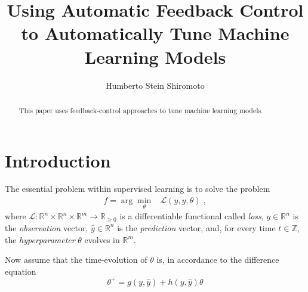 \documentclass{tufte-handout}
\title{Using Automatic Feedback Control to Automatically Tune Machine Learning Models}
\author[H. Stein Shiromoto]{Humberto Stein Shiromoto}
\begin{document}
\maketitle%

\begin{abstract}
\noindent
This paper uses feedback-control approaches to tune machine learning models.
\end{abstract}


\section{Introduction}

The essential problem within supervised learning is to solve the problem
\begin{eqnarray}
  f=\arg\min_\theta&\mathcal{L}(y,\hat{y},\theta)\;,
\end{eqnarray}
where $\mathcal{L}:\mathbb{R}^n\times\mathbb{R}^n\times\mathbb{R}^m\to\mathbb{R}_{\geq0}$ is a differentiable functional called \emph{loss}, $y\in\mathbb{R}^n$ is the \emph{observation} vector, $\hat{y}\in\mathbb{R}^n$ is the \emph{prediction} vector, and, for every time $t\in\mathbb{Z}$, the \emph{hyperparameter} $\theta$ evolves in $\mathbb{R}^m$.

Now assume that the time-evolution of $\theta$ is, in accordance to the difference equation
\begin{equation}
\theta^+=g(y,\hat{y})+h(y,\hat{y})\theta
\end{equation}
\end{document}
